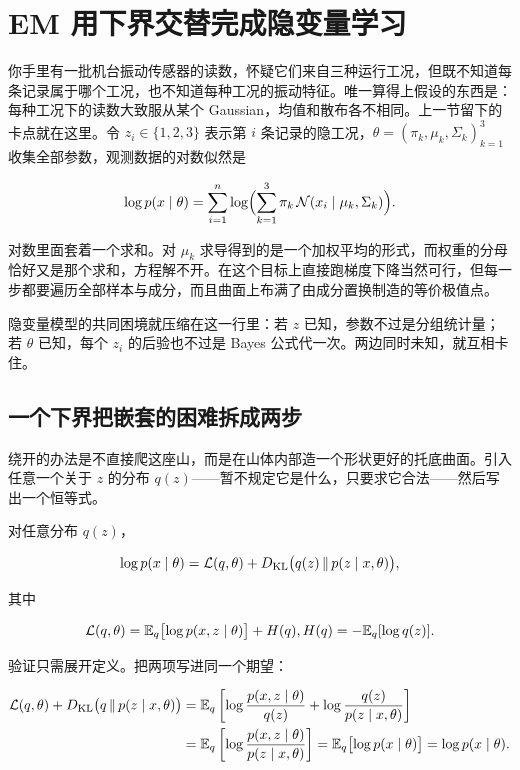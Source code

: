 \section{EM 用下界交替完成隐变量学习}
\label{sec:13-Machine-Learning/06-Probabilistic-Models/04}

你手里有一批机台振动传感器的读数，怀疑它们来自三种运行工况，但既不知道每条记录属于哪个工况，也不知道每种工况的振动特征。唯一算得上假设的东西是：每种工况下的读数大致服从某个 Gaussian，均值和散布各不相同。上一节留下的卡点就在这里。令 \(z_i\in\{1,2,3\}\) 表示第 \(i\) 条记录的隐工况，\(\theta=(\pi_k,\mu_k,\Sigma_k)_{k=1}^3\) 收集全部参数，观测数据的对数似然是

\[
\log p(x\mid\theta)
=\sum_{i=1}^n\log\Bigl(\sum_{k=1}^3\pi_k\,\mathcal N(x_i\mid\mu_k,\Sigma_k)\Bigr).
\]

对数里面套着一个求和。对 \(\mu_k\) 求导得到的是一个加权平均的形式，而权重的分母恰好又是那个求和，方程解不开。在这个目标上直接跑梯度下降当然可行，但每一步都要遍历全部样本与成分，而且曲面上布满了由成分置换制造的等价极值点。

隐变量模型的共同困境就压缩在这一行里：若 \(z\) 已知，参数不过是分组统计量；若 \(\theta\) 已知，每个 \(z_i\) 的后验也不过是 Bayes 公式代一次。两边同时未知，就互相卡住。

\subsection{一个下界把嵌套的困难拆成两步}

绕开的办法是不直接爬这座山，而是在山体内部造一个形状更好的托底曲面。引入任意一个关于 \(z\) 的分布 \(q(z)\)——暂不规定它是什么，只要求它合法——然后写出一个恒等式。

\begin{proposition}[边缘似然的下界分解]
对任意分布 \(q(z)\)，

\[
\log p(x\mid\theta)
=\mathcal L(q,\theta)
+D_{\mathrm{KL}}\bigl(q(z)\,\|\,p(z\mid x,\theta)\bigr),
\]

其中

\[
\mathcal L(q,\theta)
=\mathbb{E}_q\bigl[\log p(x,z\mid\theta)\bigr]+H(q),
\space
H(q)=-\mathbb{E}_q[\log q(z)].
\]
\end{proposition}

验证只需展开定义。把两项写进同一个期望：

\[
\begin{aligned}
\mathcal L(q,\theta)+D_{\mathrm{KL}}\bigl(q\,\|\,p(z\mid x,\theta)\bigr)
&=\mathbb{E}_q\left[\log\frac{p(x,z\mid\theta)}{q(z)}
+\log\frac{q(z)}{p(z\mid x,\theta)}\right]\\
&=\mathbb{E}_q\left[\log\frac{p(x,z\mid\theta)}{p(z\mid x,\theta)}\right]
=\mathbb{E}_q\bigl[\log p(x\mid\theta)\bigr]
=\log p(x\mid\theta).
\end{aligned}
\]

